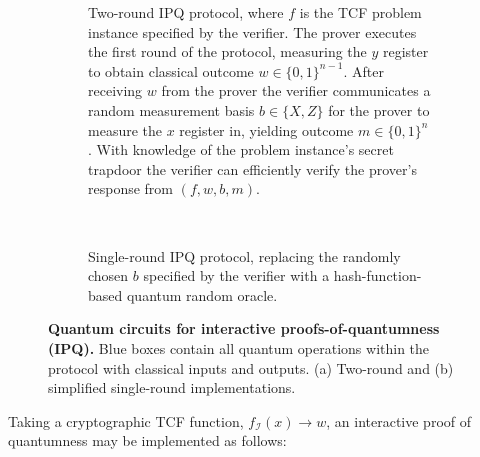 \begin{figure}[!htp]
	\centering
	\begin{subfigure}[c]{\linewidth}
			
			\caption{Two-round IPQ protocol, where $f$ is the TCF problem instance specified by the verifier. The prover executes the first round of the protocol, measuring the $y$ register to obtain classical outcome $w\in\{0,1\}^{n-1}$. After receiving $w$ from the prover the verifier communicates a random measurement basis $b\in\{X,Z\}$ for the prover to measure the $x$ register in, yielding outcome $m\in\{0,1\}^n$. With knowledge of the problem instance's secret trapdoor the verifier can efficiently verify the prover's response from $(f,w,b,m)$.}
	\end{subfigure} \\
	\begin{subfigure}[c]{\linewidth}
		
		\caption{Single-round IPQ protocol, replacing the randomly chosen $b$ specified by the verifier with a hash-function-based quantum random oracle.}
	\end{subfigure}
	\caption{\textbf{Quantum circuits for interactive proofs-of-quantumness (IPQ).} Blue boxes contain all quantum operations within the protocol with classical inputs and outputs. (a) Two-round and (b) simplified single-round implementations.} \label{fig:IPQ_circuit.tex}
\end{figure}

Taking a cryptographic TCF function, $f_\mathcal{I}(x)\to w$, an interactive proof of quantumness may be implemented as follows:

